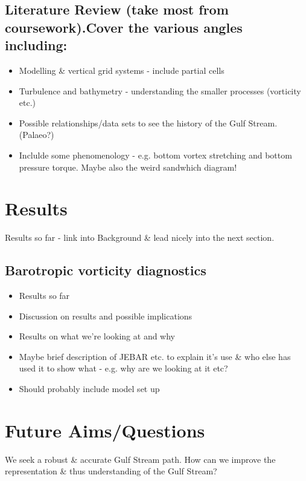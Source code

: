 \documentclass[a4paper,11pt]{article}
\begin{document}
\subsection{Literature Review (take most from coursework).Cover the various angles including:}
\begin{itemize}
  \item Modelling \& vertical grid systems - include partial cells
  \item Turbulence and bathymetry - understanding the smaller processes (vorticity etc.) \citep{Tansley2001} \citep{Nikurashin2012a}
  \item Possible relationships/data sets to see the history of the Gulf Stream. (Palaeo?) \citep{Ezer2015}
  \item Inclulde some phenomenology - e.g. bottom vortex stretching and bottom pressure torque. Maybe also the weird sandwhich diagram!
\end{itemize}


\section{Results}

Results so far - link into Background \& lead nicely into the next section.
\subsection{Barotropic vorticity diagnostics}
\begin{itemize}
  \item Results so far
  \item Discussion on results and possible implications
  \item Results on what we're looking at and why
  \item Maybe brief description of JEBAR etc. to explain it's use \& who else has used it to show what - e.g. why are we looking at it etc?
  \item Should probably include model set up
\end{itemize}



\section{Future Aims/Questions}

We seek a robust \& accurate Gulf Stream path. How can we improve the representation \& thus understanding of the Gulf Stream?
\end{document}
